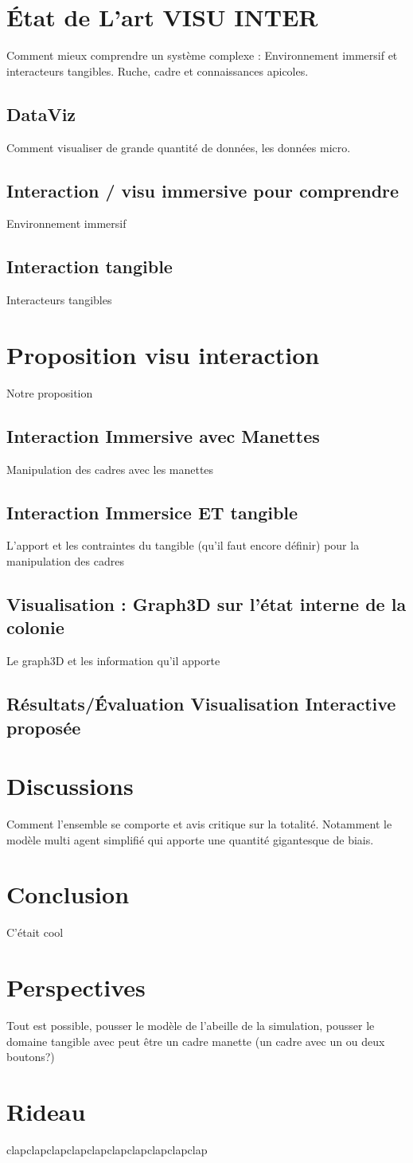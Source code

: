 \documentclass[11pt,a4paper]{article}
\begin{document}
			
\section{État de L'art VISU INTER}
	Comment mieux comprendre un système complexe : Environnement immersif et interacteurs tangibles. Ruche, cadre et connaissances apicoles.
	\subsection{DataViz}
		Comment visualiser de grande quantité de données, les données micro.
	\subsection{Interaction / visu immersive pour comprendre}
		Environnement immersif
	\subsection{Interaction tangible}
		Interacteurs tangibles
\section{Proposition visu interaction}
	Notre proposition
	\subsection{Interaction Immersive avec Manettes}
		Manipulation des cadres avec les manettes
	\subsection{Interaction Immersice ET tangible}
		L'apport et les contraintes du tangible (qu'il faut encore définir) pour la manipulation des cadres
	\subsection{Visualisation : Graph3D sur l'état interne de la colonie}
		Le graph3D et les information qu'il apporte
	\subsection{Résultats/Évaluation Visualisation Interactive proposée}
\section{Discussions}
	Comment l'ensemble se comporte et avis critique sur la totalité. Notamment le modèle multi agent simplifié qui apporte une quantité gigantesque de biais.
\section*{Conclusion}
	C'était cool
\section*{Perspectives}
	Tout est possible, pousser le modèle de l'abeille de la simulation, pousser le domaine tangible avec peut être un cadre manette (un cadre avec un ou deux boutons?)
\section*{Rideau}
	clapclapclapclapclapclapclapclapclapclap
\end{document}
